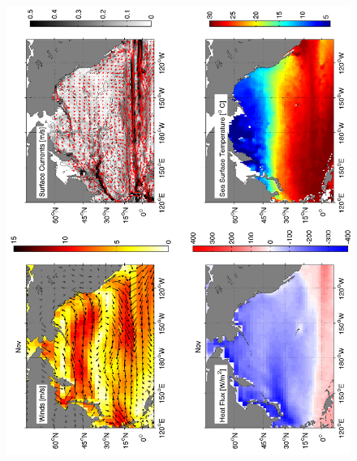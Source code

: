 \begin{figure}[hbt]
  \begin{center}
  \includegraphics[angle=270]{figs/WindOverview/SurfaceCurrents11}
    \caption{}
    \label{fig:}  
  \end{center}
\end{figure}

